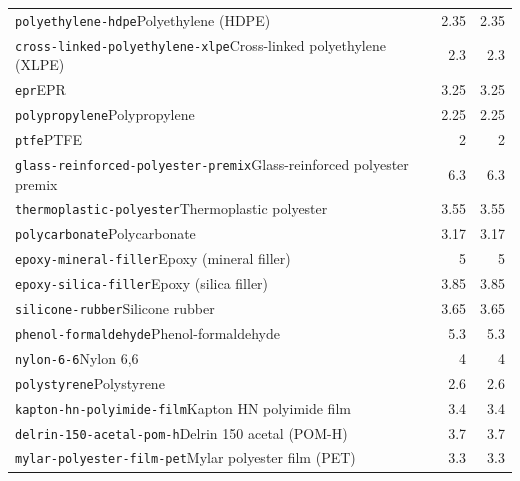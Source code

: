 \begin{longtable}{@{}p{.69\linewidth}rr@{}}
\texttt{polyethylene-hdpe}\newline Polyethylene (HDPE) & 2.35 & 2.35\\[2pt]
\texttt{cross-linked-polyethylene-xlpe}\newline Cross-linked polyethylene (XLPE) & 2.3 & 2.3\\[2pt]
\texttt{epr}\newline EPR & 3.25 & 3.25\\[2pt]
\texttt{polypropylene}\newline Polypropylene & 2.25 & 2.25\\[2pt]
\texttt{ptfe}\newline PTFE & 2 & 2\\[2pt]
\texttt{glass-reinforced-polyester-premix}\newline Glass-reinforced polyester premix & 6.3 & 6.3\\[2pt]
\texttt{thermoplastic-polyester}\newline Thermoplastic polyester & 3.55 & 3.55\\[2pt]
\texttt{polycarbonate}\newline Polycarbonate & 3.17 & 3.17\\[2pt]
\texttt{epoxy-mineral-filler}\newline Epoxy (mineral filler) & 5 & 5\\[2pt]
\texttt{epoxy-silica-filler}\newline Epoxy (silica filler) & 3.85 & 3.85\\[2pt]
\texttt{silicone-rubber}\newline Silicone rubber & 3.65 & 3.65\\[2pt]
\texttt{phenol-formaldehyde}\newline Phenol-formaldehyde & 5.3 & 5.3\\[2pt]
\texttt{nylon-6-6}\newline Nylon 6,6 & 4 & 4\\[2pt]
\texttt{polystyrene}\newline Polystyrene & 2.6 & 2.6\\[2pt]
\texttt{kapton-hn-polyimide-film}\newline Kapton HN polyimide film & 3.4 & 3.4\\[2pt]
\texttt{delrin-150-acetal-pom-h}\newline Delrin 150 acetal (POM-H) & 3.7 & 3.7\\[2pt]
\texttt{mylar-polyester-film-pet}\newline Mylar polyester film (PET) & 3.3 & 3.3\\[2pt]

\end{longtable}

